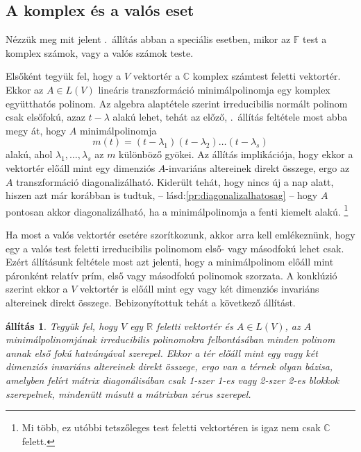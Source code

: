 \documentclass[9pt, a4paper, showtrims]{memoir}
\theoremstyle{plain}
\newtheorem{proposition}{állítás}[chapter]
\theoremstyle{remark}
\theoremstyle{definition}
\begin{document}
\subsection{A komplex és a valós eset}
Nézzük meg mit jelent .~állítás abban a speciális esetben,
mikor az $\mathbb{F}$ test a komplex számok, vagy a valós számok teste.

Elsőként tegyük fel, hogy a $V$ vektortér a $\mathbb{C}$ komplex számtest feletti vektortér.
Ekkor az $A\in L\left( V \right)$ lineáris transzformáció minimálpolinomja egy komplex együtthatós polinom.
Az algebra alaptétele szerint irreducibilis normált polinom csak elsőfokú, azaz $t-\lambda$ alakú lehet,
tehát az előző, .~állítás feltétele most abba megy át, hogy $A$ minimálpolinomja
\[
	m\left( t \right)=\left( t-\lambda_1 \right)\left( t-\lambda_2 \right)\dots\left( t-\lambda_s \right)
\]
alakú, ahol $\lambda_1,\ldots,\lambda_s$ az $m$ különböző gyökei.
Az állítás implikációja, hogy ekkor a vektortér előáll mint egy dimenziós $A$-invariáns
altereinek direkt összege, ergo az $A$ transzformáció diagonalizálható.
Kiderült tehát, hogy nincs új a nap alatt, hiszen azt már korábban is tudtuk, -- lásd:\ref{pr:diagonalizalhatosag} -- hogy $A$ pontosan akkor diagonalizálható, ha a minimálpolinomja a fenti kiemelt alakú.%
\footnote{
    Mi több, ez utóbbi tetszőleges test feletti vektortéren is igaz nem csak $\mathbb{C}$ felett.
}

Ha most a valós vektortér esetére szorítkozunk, akkor arra kell emlékeznünk, hogy
egy a valós test feletti irreducibilis polinomom első- vagy másodfokú lehet csak.
Ezért állításunk feltétele most azt jelenti, 
hogy a minimálpolinom előáll mint páronként relatív prím, első vagy másodfokú polinomok szorzata.
A konklúzió szerint ekkor a $V$ vektortér is előáll mint egy vagy két dimenziós invariáns altereinek direkt összege. Bebizonyítottuk tehát a következő állítást.
\begin{proposition}
	Tegyük fel, hogy $V$ egy $\mathbb{R}$ feletti vektortér és $A\in L\left( V \right)$,
    az $A$ minimálpolinomjának irreducibilis polinomokra felbontásában minden polinom annak első fokú hatványával szerepel.
    Ekkor a tér előáll mint egy vagy két dimenziós invariáns altereinek direkt összege,
    ergo van a térnek olyan bázisa, amelyben felírt mátrix diagonálisában csak 1-szer 1-es vagy 2-szer 2-es blokkok szerepelnek, mindenütt másutt a mátrixban zérus szerepel.
\end{proposition}
\end{document}
